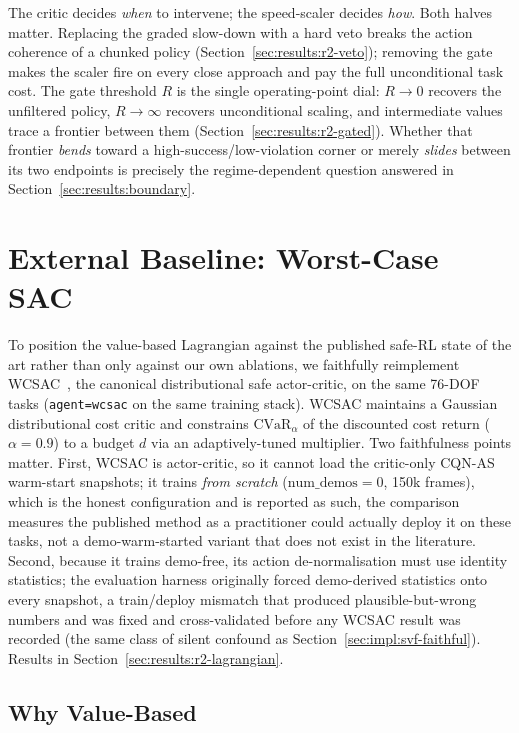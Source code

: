 \documentclass[11pt,a4paper]{report}
\newcommand{\cvar}{\ensuremath{\mathrm{CVaR}}}
\newcommand{\cqnas}{CQN-AS}
\begin{document}
The critic decides \emph{when} to intervene; the speed-scaler decides
\emph{how}. Both halves matter. Replacing the graded
slow-down with a hard veto breaks the action coherence of a chunked
policy (Section~\ref{sec:results:r2-veto}); removing the gate makes
the scaler fire on every close approach and pay the full
unconditional task cost. The gate threshold $R$ is the single
operating-point dial: $R \to 0$ recovers the unfiltered policy,
$R \to \infty$ recovers unconditional scaling, and intermediate
values trace a frontier between them
(Section~\ref{sec:results:r2-gated}). Whether that frontier
\emph{bends} toward a high-success/low-violation corner or merely
\emph{slides} between its two endpoints is precisely the
regime-dependent question answered in
Section~\ref{sec:results:boundary}.

\section{External Baseline: Worst-Case SAC}
\label{sec:method:wcsac}

To position the value-based Lagrangian against the published safe-RL
state of the art rather than only against our own ablations, we
faithfully reimplement WCSAC~\cite{yang2021wcsac,yang2023wcsacjournal},
the canonical distributional safe actor-critic, on the same 76-DOF tasks
(\texttt{agent=wcsac} on the same training stack). WCSAC maintains a
Gaussian distributional cost critic and constrains
$\cvar_{\alpha}$ of the discounted cost return ($\alpha = 0.9$) to a
budget $d$ via an adaptively-tuned multiplier. Two faithfulness
points matter. First, WCSAC is actor-critic, so it cannot load the
critic-only \cqnas{} warm-start snapshots; it trains \emph{from
scratch} ($\text{num\_demos} = 0$, 150k frames), which is the honest
configuration and is reported as such, the comparison measures the
published method as a practitioner could actually deploy it on these
tasks, not a demo-warm-started variant that does not exist in the
literature. Second, because it trains demo-free, its action
de-normalisation must use identity statistics; the evaluation harness
originally forced demo-derived statistics onto every snapshot, a
train/deploy mismatch that produced plausible-but-wrong numbers and
was fixed and cross-validated before any WCSAC result was recorded
(the same class of silent confound as
Section~\ref{sec:impl:svf-faithful}). Results in
Section~\ref{sec:results:r2-lagrangian}.
\label{sec:method:lagrangian}

\subsection{Why Value-Based}
\label{sec:method:lagrangian:why}
\end{document}
